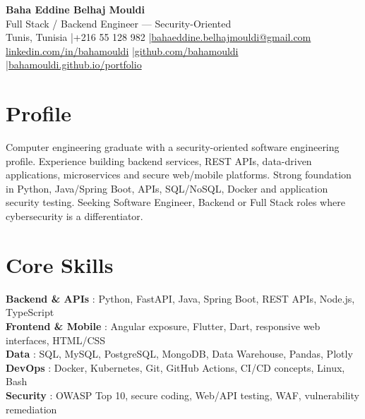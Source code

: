 \documentclass[a4paper,10pt]{article}
\begin{document}
\begin{center}
{\LARGE\bfseries\color{navy} Baha Eddine Belhaj Mouldi}\\[4pt]
{\large Full Stack / Backend Engineer — Security-Oriented}\\[6pt]
Tunis, Tunisia \quad|\quad +216 55 128 982 \quad|\quad \href{mailto:bahaeddine.belhajmouldi@gmail.com}{bahaeddine.belhajmouldi@gmail.com}\\[2pt]
\href{https://www.linkedin.com/in/bahamouldi}{linkedin.com/in/bahamouldi} \quad|\quad \href{https://github.com/bahamouldi}{github.com/bahamouldi} \quad|\quad \href{https://bahamouldi.github.io/portfolio/}{bahamouldi.github.io/portfolio}
\end{center}
\vspace{3pt}
\section{Profile}
Computer engineering graduate with a security-oriented software engineering profile. Experience building backend services, REST APIs, data-driven applications, microservices and secure web/mobile platforms. Strong foundation in Python, Java/Spring Boot, APIs, SQL/NoSQL, Docker and application security testing. Seeking Software Engineer, Backend or Full Stack roles where cybersecurity is a differentiator.
\section{Core Skills}
\textbf{Backend \& APIs} : Python, FastAPI, Java, Spring Boot, REST APIs, Node.js, TypeScript\\[1pt]
\textbf{Frontend \& Mobile} : Angular exposure, Flutter, Dart, responsive web interfaces, HTML/CSS\\[1pt]
\textbf{Data} : SQL, MySQL, PostgreSQL, MongoDB, Data Warehouse, Pandas, Plotly\\[1pt]
\textbf{DevOps} : Docker, Kubernetes, Git, GitHub Actions, CI/CD concepts, Linux, Bash\\[1pt]
\textbf{Security} : OWASP Top 10, secure coding, Web/API testing, WAF, vulnerability remediation
\end{document}
